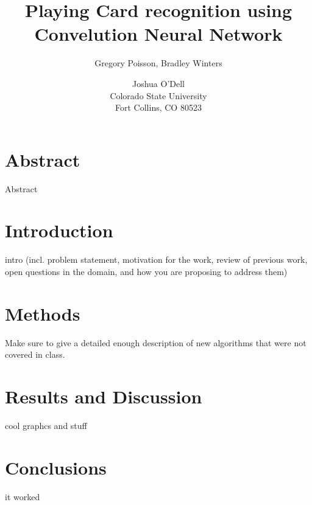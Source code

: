 \documentclass[letterpaper]{article}
\title{Playing Card recognition using Convelution Neural Network}
\author{Gregory Poisson, Bradley Winters \and Joshua O'Dell \\ Colorado State University \\ Fort Collins, CO 80523 }
\begin{document}
\maketitle

\section{Abstract}

Abstract

\section{Introduction}

intro (incl. problem statement, motivation for the work, review of previous work, open questions in the domain, and how you are proposing to address them)

\section{Methods}

Make sure to give a detailed enough description of new algorithms that were not covered in class.

\section{Results and Discussion}

cool graphcs and stuff

\section{Conclusions}

it worked

\nocite{*}


\end{document}
